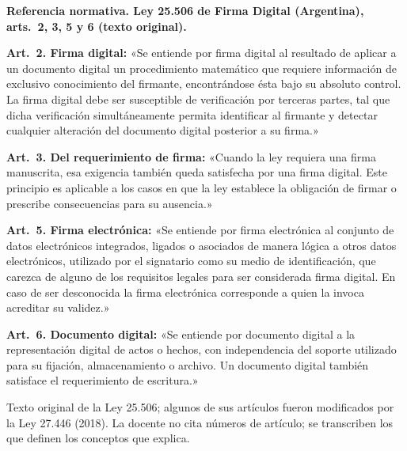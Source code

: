 \documentclass[12pt,oneside]{book}
\begin{document}
\begin{note}
\textbf{Referencia normativa. Ley 25.506 de Firma Digital (Argentina), arts.\ 2, 3, 5 y 6 (texto original).}

\textbf{Art.\ 2. Firma digital:} «Se entiende por firma digital al resultado de aplicar a un documento digital un procedimiento matemático que requiere información de exclusivo conocimiento del firmante, encontrándose ésta bajo su absoluto control. La firma digital debe ser susceptible de verificación por terceras partes, tal que dicha verificación simultáneamente permita identificar al firmante y detectar cualquier alteración del documento digital posterior a su firma.»

\textbf{Art.\ 3. Del requerimiento de firma:} «Cuando la ley requiera una firma manuscrita, esa exigencia también queda satisfecha por una firma digital. Este principio es aplicable a los casos en que la ley establece la obligación de firmar o prescribe consecuencias para su ausencia.»

\textbf{Art.\ 5. Firma electrónica:} «Se entiende por firma electrónica al conjunto de datos electrónicos integrados, ligados o asociados de manera lógica a otros datos electrónicos, utilizado por el signatario como su medio de identificación, que carezca de alguno de los requisitos legales para ser considerada firma digital. En caso de ser desconocida la firma electrónica corresponde a quien la invoca acreditar su validez.»

\textbf{Art.\ 6. Documento digital:} «Se entiende por documento digital a la representación digital de actos o hechos, con independencia del soporte utilizado para su fijación, almacenamiento o archivo. Un documento digital también satisface el requerimiento de escritura.»

Texto original de la Ley 25.506; algunos de sus artículos fueron modificados por la Ley 27.446 (2018). La docente no cita números de artículo; se transcriben los que definen los conceptos que explica.
\end{note}
\end{document}
